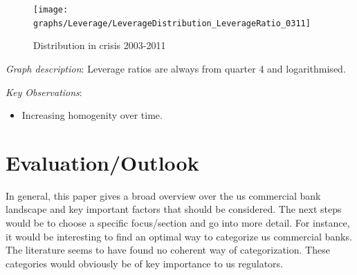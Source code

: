 \documentclass[12pt, a4paper]{article} %
\begin{document}
\pagebreak


\begin{figure}[hbtp]
\centering
\caption{Distribution in crisis 2003-2011}
\texttt{[image: graphs/Leverage/LeverageDistribution\_LeverageRatio\_0311]}
\end{figure}

\noindent \textit{Graph description}: Leverage ratios are always from quarter 4 and  logarithmised.

\noindent \textit{Key Observations}:
\begin{itemize}
\item Increasing homogenity over time.
\end{itemize}

\fi

\newpage
\section{Evaluation/Outlook}

In general, this paper gives a broad overview over the us commercial bank landscape and key important factors that should be considered. The next steps would be to choose a specific focus/section and go into more detail. For instance, it would be interesting to find an optimal way to categorize us commercial banks. The literature seems to have found no coherent way of categorization. These categories would obviously be of key importance to us regulators.
\end{document}
